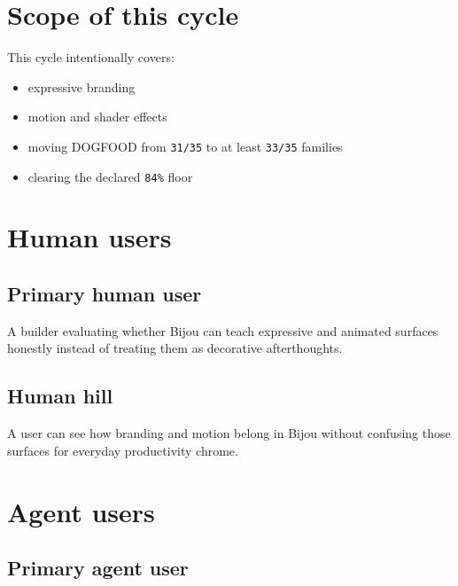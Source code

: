 \section{Scope of this cycle}\label{record-080-scope-of-this-cycle}

This cycle intentionally covers:

\begin{itemize}
\tightlist
\item
  expressive branding
\item
  motion and shader effects
\item
  moving DOGFOOD from \texttt{3\allowbreak{}1\allowbreak{}/\allowbreak{}3\allowbreak{}5} to at least \texttt{3\allowbreak{}3\allowbreak{}/\allowbreak{}3\allowbreak{}5} families
\item
  clearing the declared \texttt{8\allowbreak{}4\allowbreak{}\%} floor
\end{itemize}

\section{Human users}\label{record-080-human-users}

\subsection{Primary human user}\label{record-080-primary-human-user}

A builder evaluating whether Bijou can teach expressive and animated surfaces honestly instead of treating them as decorative afterthoughts.

\subsection{Human hill}\label{record-080-human-hill}

A user can see how branding and motion belong in Bijou without confusing those surfaces for everyday productivity chrome.

\section{Agent users}\label{record-080-agent-users}

\subsection{Primary agent user}\label{record-080-primary-agent-user}

